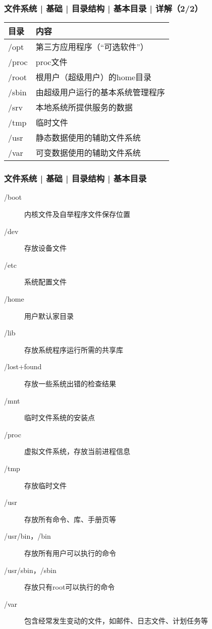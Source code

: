 \begin{frame}
  \frametitle{文件系统 | 基础 | 目录结构 | \alert{基本目录} | 详解（2/2）}
  \begin{table}
    \centering
    \begin{tabular}{ll}
      \hline
      \rowcolor{blue!50}目录 & 内容\\
      \hline
      /opt & 第三方应用程序（“可选软件”）\\
      /proc & proc文件\\
      /root & 根用户（超级用户）的home目录\\
      /sbin & 由超级用户运行的基本系统管理程序\\
      /srv & 本地系统所提供服务的数据\\
      /tmp & 临时文件\\
      /usr & 静态数据使用的辅助文件系统\\
      /var & 可变数据使用的辅助文件系统\\
      \hline
    \end{tabular}
  \end{table}
\end{frame}

\begin{frame}
  \frametitle{文件系统 | 基础 | 目录结构 | 基本目录}
  \begin{description}
    \item[/boot] 内核文件及自举程序文件保存位置
    \item[/dev] 存放设备文件
    \item[/etc] 系统配置文件
    \item[/home] 用户默认家目录
    \item[/lib] 存放系统程序运行所需的共享库
    \item[/lost+found] 存放一些系统出错的检查结果
    \item[/mnt] 临时文件系统的安装点
    \item[/proc] 虚拟文件系统，存放当前进程信息
    \item[/tmp] 存放临时文件
    \item[/usr] 存放所有命令、库、手册页等
    \item[/usr/bin，/bin] 存放所有用户可以执行的命令
    \item[/usr/sbin，/sbin] 存放只有root可以执行的命令
    \item[/var] 包含经常发生变动的文件，如邮件、日志文件、计划任务等
  \end{description}
\end{frame}

